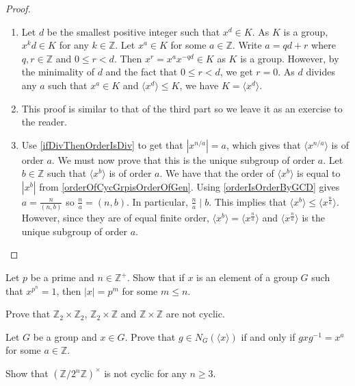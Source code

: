 \begin{proof}
    \phantom{beegyoshi}
    \begin{enumerate}
        \item Let $d$ be the smallest positive integer such that $x^d\in K$. As $K$ is a group, $x^kd\in K$ for any $k\in\mathbb{Z}$. Let $x^a\in K$ for some $a\in\mathbb{Z}$. Write $a=qd+r$ where $q,r\in\mathbb{Z}$ and $0\leq r<d$. Then $x^r=x^{a}x^{-qd}\in K$ as $K$ is a group. However, by the minimality of $d$ and the fact that $0\leq r<d$, we get $r=0$. As $d$ divides any $a$ such that $x^a\in K$ and $\langle x^d\rangle\leq K$, we have $K=\langle x^d\rangle$.
        \item This proof is similar to that of the third part so we leave it as an exercise to the reader.
        \item Use \ref{ifDivThenOrderIsDiv} to get that $|x^{n/a}|=a$, which gives that $\langle x^{n/a}\rangle$ is of order $a$. We must now prove that this is the unique subgroup of order $a$. Let $b\in\mathbb{Z}$ such that $\langle x^b\rangle$ is of order $a$. We have that the order of $\langle x^b\rangle$ is equal to $|x^b|$ from \ref{orderOfCycGrpisOrderOfGen}. Using \ref{orderIsOrderByGCD} gives $a=\frac{n}{(n,b)}$ so $\frac na=(n,b)$. In particular, $\frac na\mid b$. This implies that $\langle x^b\rangle\leq\langle x^\frac{n}{a}\rangle$. However, since they are of equal finite order, $\langle x^b\rangle=\langle x^\frac{n}{a}\rangle$ and $\langle x^\frac{n}{a}\rangle$ is the unique subgroup of order $a$. 
    \end{enumerate}
\end{proof}

\begin{exercise}
    Let $p$ be a prime and $n\in\mathbb{Z}^+$. Show that if $x$ is an element of a group $G$ such that $x^{p^n}=1$, then $|x|=p^m$ for some $m\leq n$.
\end{exercise}

\begin{exercise}
    Prove that $\mathbb{Z}_2\times\mathbb{Z}_2$, $\mathbb{Z}_2\times\mathbb{Z}$ and $\mathbb{Z}\times\mathbb{Z}$ are not cyclic.
\end{exercise}

\begin{exercise}
    Let $G$ be a group and $x\in G$. Prove that $g\in N_G(\langle x\rangle)$ if and only if $gxg^{-1}=x^a$ for some $a\in\mathbb{Z}$.
\end{exercise}

\begin{exercise}
    Show that $(\mathbb{Z}/2^n\mathbb{Z})^\times$ is not cyclic for any $n\geq 3$.
\end{exercise}


\clearpage